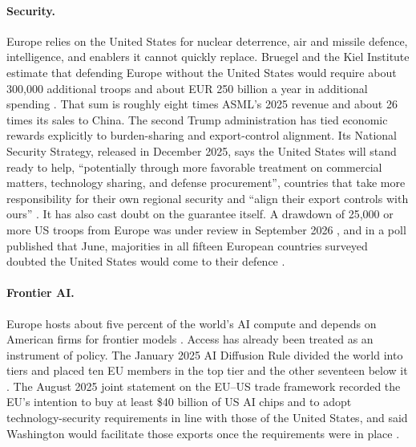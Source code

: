 \paragraph{Security.} Europe relies on the United States for nuclear deterrence, air and missile defence, intelligence, and enablers it cannot quickly replace. Bruegel and the Kiel Institute estimate that defending Europe without the United States would require about 300,000 additional troops and about EUR 250 billion a year in additional spending \citep{burilkov2025defending}. That sum is roughly eight times ASML's 2025 revenue and about 26 times its sales to China. The second Trump administration has tied economic rewards explicitly to burden-sharing and export-control alignment. Its National Security Strategy, released in December 2025, says the United States will stand ready to help, ``potentially through more favorable treatment on commercial matters, technology sharing, and defense procurement'', countries that take more responsibility for their own regional security and ``align their export controls with ours'' \citep{whitehouse2025nss}. It has also cast doubt on the guarantee itself. A drawdown of 25,000 or more US troops from Europe was under review in September 2026 \citep{nbc2026pentagon}, and in a poll published that June, majorities in all fifteen European countries surveyed doubted the United States would come to their defence \citep{ecfr2026home}.

\paragraph{Frontier AI.} Europe hosts about five percent of the world's AI compute and depends on American firms for frontier models \citep{juijn2026europe}. Access has already been treated as an instrument of policy. The January 2025 AI Diffusion Rule divided the world into tiers and placed ten EU members in the top tier and the other seventeen below it \citep{bis2025diffusion}. The August 2025 joint statement on the EU--US trade framework recorded the EU's intention to buy at least \$40 billion of US AI chips and to adopt technology-security requirements in line with those of the United States, and said Washington would facilitate those exports once the requirements were in place \citep{whitehouse2025jointstatement}.

